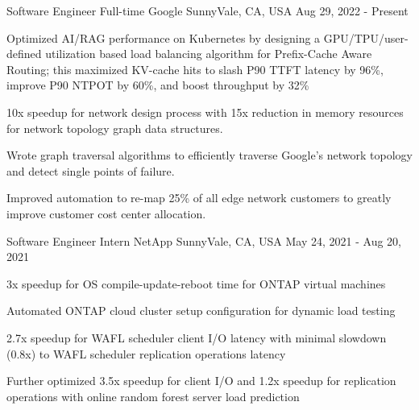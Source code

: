 

\begin{cventries}
  \cventry
    {Software Engineer Full-time} %
    {Google} %
    {SunnyVale, CA, USA} %
    {Aug 29, 2022 - Present} %
    {
      \begin{cvitems} %
        \item {Optimized AI/RAG performance on Kubernetes by designing a
          GPU/TPU/user-defined utilization based load balancing algorithm for
          Prefix-Cache Aware Routing; this maximized KV-cache hits to slash
          P90 TTFT latency by 96\%, improve P90 NTPOT by 60\%, and boost
          throughput by 32\%}
        \item {10x speedup for network design process with 15x reduction in
          memory resources for network topology graph data structures.}
        \item {Wrote graph traversal algorithms to efficiently traverse Google's
          network topology and detect single points of failure.}
        \item {Improved automation to re-map 25\% of all edge network customers
          to greatly improve customer cost center allocation.}
      \end{cvitems}
    }

  \cventry
    {Software Engineer Intern} %
    {NetApp} %
    {SunnyVale, CA, USA} %
    {May 24, 2021 - Aug 20, 2021} %
    {
      \begin{cvitems} %
        \item {3x speedup for OS compile-update-reboot time for ONTAP virtual machines}
        \item {Automated ONTAP cloud cluster setup configuration for dynamic load testing}
        \item {2.7x speedup for WAFL scheduler client I/O latency with minimal
               slowdown (0.8x) to WAFL scheduler replication operations latency}
        \item {Further optimized 3.5x speedup for client I/O and 1.2x speedup
               for replication operations with online random forest server
               load prediction}
      \end{cvitems}
    }


\end{cventries}
